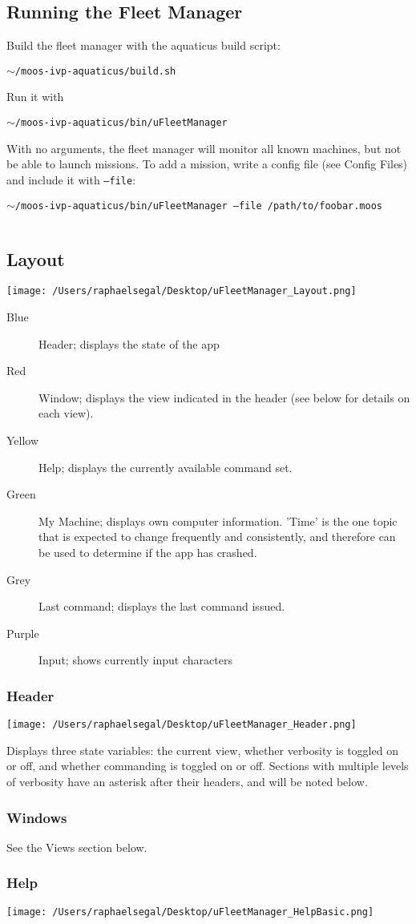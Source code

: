 \documentclass[11pt]{article}
\newcommand{\cmdline}[1]{\vspace{.2em} $\:$\\ \begin{minipage}{\dimexpr\textwidth-2cm}
\texttt{#1}
\end{minipage} $\:$\\ \vspace{-.2em} }
\begin{document}
\subsection{Running the Fleet Manager}
Build the fleet manager with the aquaticus build script:
\cmdline{$\sim$/moos-ivp-aquaticus/build.sh}
Run it with
\cmdline{$\sim$/moos-ivp-aquaticus/bin/uFleetManager}
With no arguments, the fleet manager will monitor all known machines, but not be able to launch missions. To add a mission, write a config file (see Config Files) and include it with \texttt{--file}:
\cmdline{$\sim$/moos-ivp-aquaticus/bin/uFleetManager --file /path/to/foobar.moos}
\subsection{Layout}
\texttt{[image: /Users/raphaelsegal/Desktop/uFleetManager\_Layout.png]}
\begin{description}
\item[Blue] Header; displays the state of the app
\item[Red] Window; displays the view indicated in the header (see below for details on each view).
\item[Yellow] Help; displays the currently available command set.
\item[Green] My Machine; displays own computer information. 'Time' is the one topic that is expected to change frequently and consistently, and therefore can be used to determine if the app has crashed.
\item[Grey] Last command; displays the last command issued. 
\item[Purple] Input; shows currently input characters
\end{description}
\subsubsection{Header}
\texttt{[image: /Users/raphaelsegal/Desktop/uFleetManager\_Header.png]}

Displays three state variables: the current view, whether verbosity is toggled on or off, and whether commanding is toggled on or off. Sections with multiple levels of verbosity have an asterisk after their headers, and will be noted below.
\subsubsection{Windows}
See the Views section below.
\subsubsection{Help}
\texttt{[image: /Users/raphaelsegal/Desktop/uFleetManager\_HelpBasic.png]}
\end{document}
